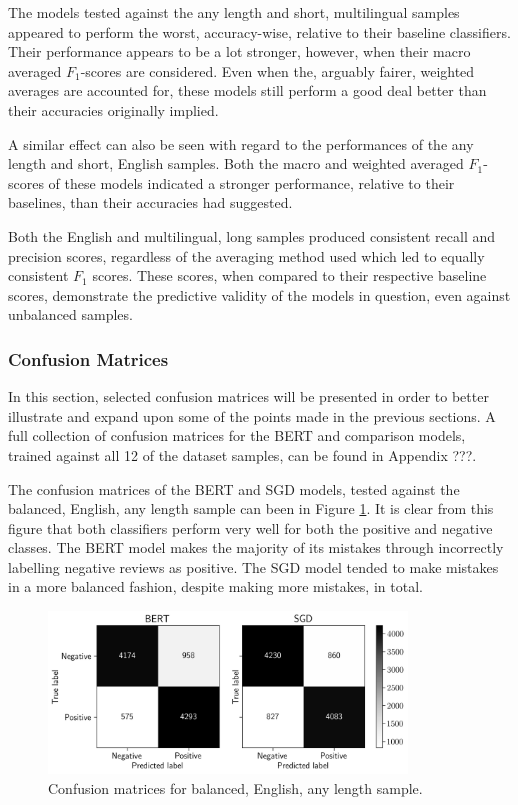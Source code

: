 The models tested against the any length and short, multilingual samples appeared to perform the worst, accuracy-wise, relative to their baseline classifiers. Their performance appears to be a lot stronger, however, when their macro averaged $F_1$-scores are considered. Even when the, arguably fairer, weighted averages are accounted for, these models still perform a good deal better than their accuracies originally implied.

A similar effect can also be seen with regard to the performances of the any length and short, English samples. Both the macro and weighted averaged $F_1$-scores of these models indicated a stronger performance, relative to their baselines, than their accuracies had suggested.

Both the English and multilingual, long samples produced consistent recall and precision scores, regardless of the averaging method used which led to equally consistent $F_1$ scores. These scores, when compared to their respective baseline scores, demonstrate the predictive validity of the models in question, even against unbalanced samples.

\subsubsection{Confusion Matrices}

In this section, selected confusion matrices will be presented in order to better illustrate and expand upon some of the points made in the previous sections. A full collection of confusion matrices for the BERT and comparison models, trained against all 12 of the dataset samples, can be found in Appendix ???.

The confusion matrices of the BERT and SGD models, tested against the balanced, English, any length sample can been in Figure \ref{fig:Res_RF_Pol_CM_EBA}. It is clear from this figure that both classifiers perform very well for both the positive and negative classes. The BERT model makes the majority of its mistakes through incorrectly labelling negative reviews as positive. The SGD model tended to make mistakes in a more balanced fashion, despite making more mistakes, in total.

\begin{figure}[ht]
    \centering
    \includegraphics[width=0.85\textwidth]{figures/06_results/01_rfp/01_pol/01_cm/eng_eq_any.png}
    \caption{Confusion matrices for balanced, English, any length sample.}
    \label{fig:Res_RF_Pol_CM_EBA}
\end{figure}


